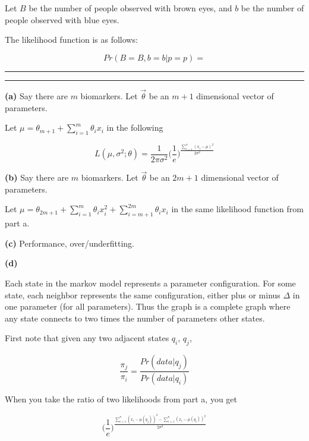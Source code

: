 \documentclass[11pt,letterpaper]{article}
\newcommand{\question}[1] {\vspace{.25in} \hrule\vspace{0.5em}
\noindent{\bf #1} \vspace{0.5em}
\hrule \vspace{.10in}}
\renewcommand{\part}[1] {\vspace{.10in} {\bf (#1)}}
\begin{document}
Let $B$ be the number of people observed with brown eyes,
and $b$ be the number of people observed with blue eyes.

The likelihood function is as follows:

$$Pr(B=B, b=b | p=p) = $$

\question{2}

\part{a}
Say there are $m$ biomarkers. Let $\vec{\theta}$ be an $m+1$ dimensional vector of parameters.

Let $\mu =  \theta_{m+1} + \sum_{i=1}^{m} \theta_i x_i $ in the following

$$L(\mu, \sigma^2; \theta) = \frac{1}{2\pi\sigma^2} \bigg(\frac{1}{e}\bigg)^\frac{\sum_{i=1}^{n} (x_i-\mu)^2}{2\sigma^2}$$

\part{b}
Say there are $m$ biomarkers. Let $\vec{\theta}$ be an $2m+1$ dimensional vector of parameters.

Let $\mu =  \theta_{2m+1} + \sum_{i=1}^{m} \theta_i x_i^2 + \sum_{i=m+1}^{2m} \theta_i x_i $ in the same likelihood function from part a.

\part{c}
Performance, over/underfitting.

\part{d}

Each state in the markov model represents a parameter configuration.
For some state, each neighbor represents
the same configuration, either plus or minus $\Delta$ in one parameter (for all parameters).
Thus the graph is a complete graph where any state connects to two times
the number of parameters other states.

First note that given any two adjacent states $q_i$, $q_j$,

$$\frac{\pi_j}{\pi_i} = \frac{Pr(data | q_j)}{Pr(data | q_i)}$$

When you take the ratio of two likelihoods from part a, you get

$$\bigg(\frac{1}{e}\bigg)^{\frac{\sum_{i=1}^{n} (x_i-\mu(q_j))^2 - \sum_{i=1}^{n} (x_i-\mu(q_i))^2}{2\sigma^2}}$$
\end{document}
